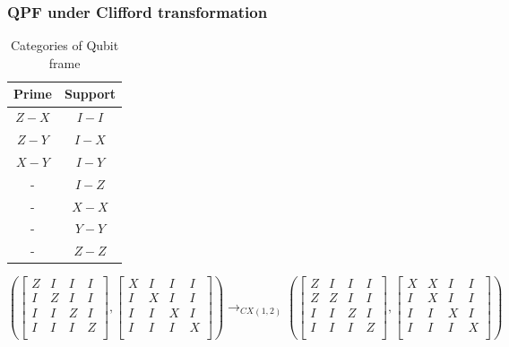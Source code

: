 \documentclass[a4paper,12pt]{article}
\begin{document}
\subsubsection{QPF under Clifford transformation}

\begin{table}[!ht]
    \centering
    \caption{Categories of Qubit frame}
    \begin{tabular}{cc}
        \hline
        Prime & Support\\
        \hline
        \hline
        $Z-X$& $I-I$\\
        $Z-Y$& $I-X$\\
        $X-Y$& $I-Y$\\
        -    & $I-Z$\\
        -    & $X-X$\\
        -    & $Y-Y$\\
        -    & $Z-Z$\\
        \hline
    \end{tabular}
\end{table}

\begin{equation}
    \left( 
        \begin{bmatrix}
        Z & I & I & I \\
        I & Z & I & I \\
        I & I & Z & I \\
        I & I & I & Z \\
        \end{bmatrix},
        \begin{bmatrix}
        X & I & I & I \\
        I & X & I & I \\
        I & I & X & I \\
        I & I & I & X \\
        \end{bmatrix}
    \right) \rightarrow_{CX(1,2)} 
    \left( 
        \begin{bmatrix}
        Z & I & I & I \\
        Z & Z & I & I \\
        I & I & Z & I \\
        I & I & I & Z \\
        \end{bmatrix},
        \begin{bmatrix}
        X & X & I & I \\
        I & X & I & I \\
        I & I & X & I \\
        I & I & I & X \\
        \end{bmatrix}
    \right) 
\end{equation}
\end{document}

